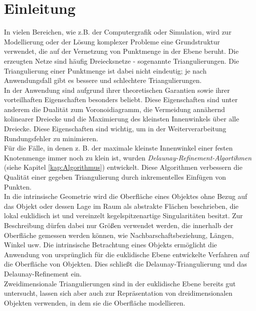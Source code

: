 \chapter{Einleitung}


In vielen Bereichen, wie z.B. der Computergrafik oder Simulation, wird zur Modellierung oder der Lösung komplexer Probleme eine  Grundstruktur verwendet, die auf der Vernetzung von Punktmenge in der Ebene beruht. Die erzeugten Netze sind häufig Dreiecksnetze - sogenannte  Triangulierungen.
Die Triangulierung einer Punktmenge ist dabei nicht eindeutig; je nach Anwendungsfall gibt es bessere und schlechtere Triangulierungen.\\ 
In der Anwendung  sind \delaunayTriagnulierung\cite{lee:1986:DelaunayTriangulation} aufgrund  ihrer theoretischen Garantien sowie ihrer  vorteilhaften Eigenschaften besonders beliebt. Diese Eigenschaften sind unter anderem die Dualität zum Voronoidiagramm\cite{aurenhammer:2000:voronoi}, die Vermeidung annähernd kolinearer Dreiecke und die Maximierung  des kleinsten Innenwinkels über alle Dreiecke. Diese Eigenschaften sind wichtig, um in der Weiterverarbeitung Rundungsfehler zu minimieren.\\
Für die Fälle, in denen z. B. der maximale kleinste Innenwinkel einer festen Knotenmenge immer noch zu klein ist, wurden \textit{Delaunay-Refinement-Algortihmen} (siehe Kapitel \ref{kap:Algorithmus}) entwickelt. Diese Algorithmen verbessern die Qualität einer gegeben Triangulierung  durch inkrementelles Einfügen von Punkten. \\

In die intrinsische Geometrie \cite{Bobenko:2006:SIGGRAPH,Bobenko:2007:LaplaceBeltrami} wird die Oberfläche eines Objektes ohne Bezug auf das Objekt oder dessen Lage im Raum als abstrakte Flächen beschrieben,  die lokal euklidisch ist und vereinzelt kegelspitzenartige Singularitäten besitzt. Zur Beschreibung dürfen dabei nur Größen verwendet werden, die  innerhalb der Oberfläche gemessen werden können, wie Nachbarschaftsbeziehung, Längen, Winkel usw. Die intrinsische Betrachtung eines Objekts ermöglicht die Anwendung von ursprünglich für die euklidische Ebene entwickelte Verfahren auf die Oberfläche von Objekten. Dies schließt die Delaunay-Triangulierung  \cite{Bobenko:2006:SIGGRAPH} und das Delaunay-Refinement \cite{Sharp:2019:NIT} ein. \\

Zweidimensionale Triangulierungen sind in  der euklidische Ebene bereits gut untersucht\cite{SHEWCHUK:2002:chuws}, lassen sich aber auch zur Repräsentation von dreidimensionalen Objekten verwenden, in dem sie die Oberfläche modellieren.\\ 

